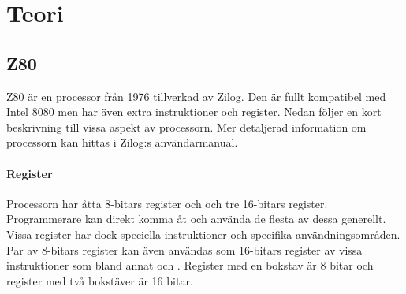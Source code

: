 \documentclass[main.tex]{subfiles}
\begin{document}
\section{Teori}
\subsection{Z80}
Z80 är en processor från 1976 tillverkad av Zilog. Den är fullt kompatibel med
Intel 8080 men har även extra instruktioner och register. Nedan följer en kort
beskrivning till vissa aspekt av processorn. Mer detaljerad information om
processorn kan hittas i Zilog:s användarmanual.\cite{z80um}

\paragraph{Register}
    Processorn har åtta 8-bitars register och och tre 16-bitars register.
    Programmerare kan direkt komma åt och använda de flesta av dessa generellt.
    Vissa register har dock speciella instruktioner och specifika
    användningsområden. Par av 8-bitars register kan även användas som
    16-bitars register av vissa instruktioner som bland annat 
    och . Register med en bokstav är 8 bitar och register med
    två bokstäver är 16 bitar.
\end{document}

